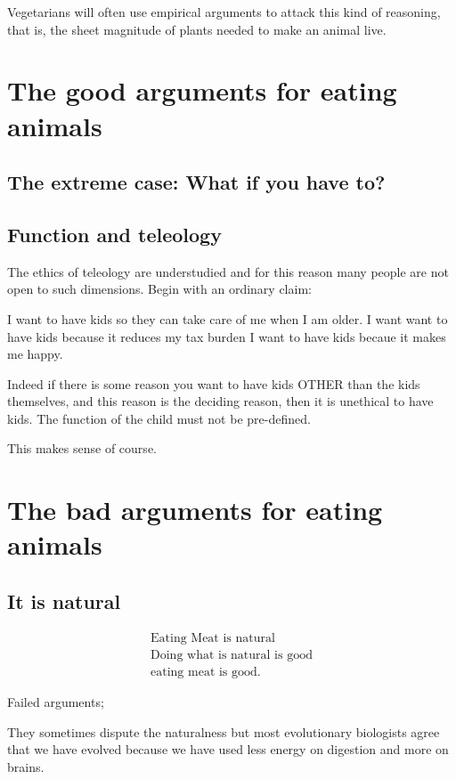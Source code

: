 \documentclass[12pt]{report}
\numberwithin{equation}{section}
\begin{document}
Vegetarians will often use empirical arguments to attack this kind of reasoning, that is, the sheet magnitude of plants needed to make an animal live. 


\chapter{The good arguments for eating animals}

\section{The extreme case: What if you have to?}

\section{Function and teleology}

The ethics of teleology are understudied and for this reason many people are not open to such dimensions. Begin with an ordinary claim:

I want to have kids so they can take care of me when I am older.
I want want to have kids because it reduces my tax burden
I want to have kids becaue it makes me happy. 

Indeed if there is some reason you want to have kids OTHER than the kids themselves, and this reason is the deciding reason, then it is unethical to have kids. The function of the child must not be pre-defined. 

This makes sense of course. 

\chapter{The bad arguments for eating animals}

\section{It is natural}

\begin{align}
\text{Eating Meat is natural} \\
\text{Doing what is natural is good} \\
\text{eating meat is good.}
\end{align}

Failed arguments;


They sometimes dispute the naturalness but most evolutionary biologists agree that we have evolved because we have used less energy on digestion and more on brains.  
\end{document}
